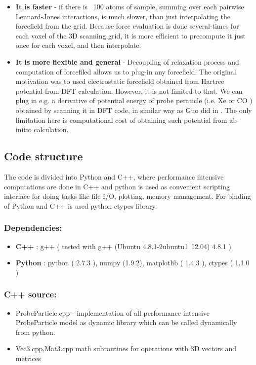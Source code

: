 \begin{itemize}

    \item \textbf{It is faster} - if there is ~100 atoms of sample, summing over
    each pairwise Lennard-Jones interactions, is much slower, than just
    interpolating the forcefield from the grid. Because force evaluation is done
    several-times for each voxel of the 3D scanning grid, it is more efficient
    to precompute it just once for each voxel, and then interpolate.

    \item \textbf{It is more flexible and general} - Decoupling of relaxation
    process and computation of forcefiled allows us to plug-in any forcefield.
    The original motivation was to used electrostatic forcefield obtained from
    Hartree potential from DFT calculation. However, it is not limited to that.
    We can plug in e.g. a derivative of potential energy of probe peraticle
    (i.e. Xe or CO ) obtained by scanning it in DFT code, in similar way as Guo
    did in \cite{chshguohighresolmodel} . The only limitation here is computational cost of obtaining
    such potential from ab-initio calculation.
\end{itemize}



\subsection{Code structure}
The code is divided into Python and C++, where performance intensive
computations are done in C++ and python is used as convenient scripting
interface for doing tasks like file I/O, plotting, memory management. For
binding of Python and C++ is used python ctypes library. 


\subsubsection{Dependencies:}
\begin{itemize}
    \item \textbf{C++} : g++ ( tested with g++ (Ubuntu 4.8.1-2ubuntu1~12.04) 4.8.1 )
    \item \textbf{Python} : python ( 2.7.3 ), numpy (1.9.2), matplotlib ( 1.4.3 ), ctypes
    ( 1.1.0 )
\end{itemize}

\subsubsection{C++ source:}
\begin{itemize}
    \item  ProbeParticle.cpp - implementation of all performance intensive
    ProbeParticle model as dynamic library which can be called dynamically from
    python.
    \item Vec3.cpp,Mat3.cpp math subroutines for operations with 3D vectors and
    metrices
\end{itemize}

